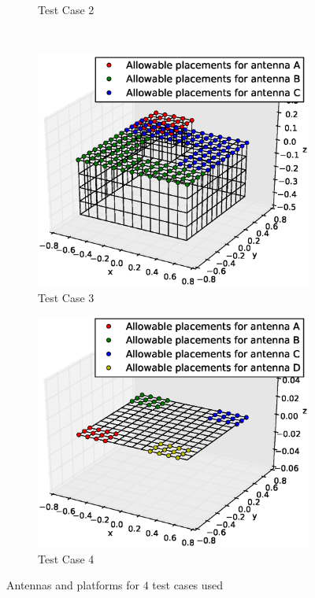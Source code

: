 \documentclass[conference]{IEEEtran}
\begin{document}
\begin{figure}
\begin{subfigure}{.5\columnwidth}
        \caption{Test Case 2}%
    \label{fig:tc2_figure}%
    \end{subfigure}\hfill\\%
    \begin{subfigure}{.5\columnwidth}
        \includegraphics[width=\columnwidth, height=\columnwidth]{FIG/tc3_figure}%
        \caption{Test Case 3}%
    \label{fig:plat2}%
    \end{subfigure}\hfill%
    \begin{subfigure}{.5\columnwidth}
        \includegraphics[width=\columnwidth,height=\columnwidth]{FIG/tc4_figure}%
        \caption{Test Case 4}%
        \label{fig:plat3}%
    \end{subfigure}\hfill
    \caption{Antennas and platforms for $4$ test cases used}
    \label{fig:tc_figures}
\end{figure}
\end{document}
